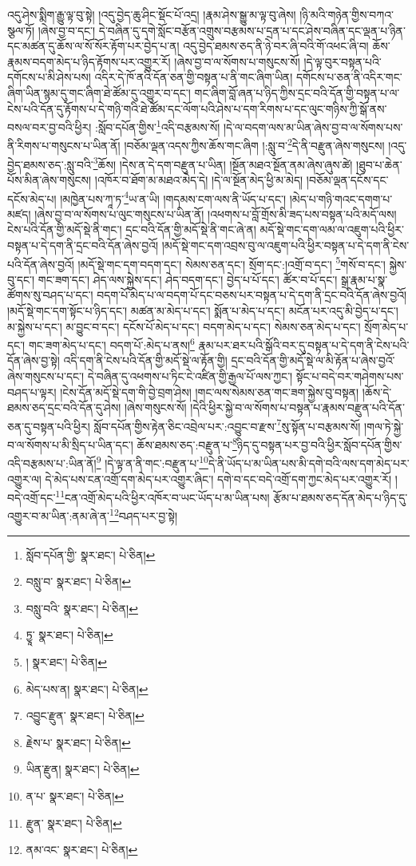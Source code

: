 འདུ་ཤེས་སྨིག་རྒྱུ་ལྟ་བུ་སྟེ། །འདུ་བྱེད་ཆུ་ཤིང་སྡོང་པོ་འདྲ། །རྣམ་ཤེས་སྒྱུ་མ་ལྟ་བུ་ཞེས། །ཉི་མའི་གཉེན་གྱིས་བཀའ་སྩལ་ཏོ། །ཞེས་བྱ་བ་དང་། དེ་བཞིན་དུ་དགེ་སློང་བརྩོན་འགྲུས་བརྩམས་པ་དྲན་པ་དང་ཤེས་བཞིན་དང་ལྡན་པ་ཉིན་དང་མཚན་དུ་ཆོས་ལ་སོ་སོར་རྟོག་པར་བྱེད་པ་ན། འདུ་བྱེད་ཐམས་ཅད་ནི་ཉེ་བར་ཞི་བའི་གོ་འཕང་ཞི་བ། ཆོས་རྣམས་བདག་མེད་པ་ཉིད་རྟོགས་པར་འགྱུར་རོ། །ཞེས་བྱ་བ་ལ་སོགས་པ་གསུངས་སོ། །དེ་ལྟ་བུར་བསྟན་པའི་དགོངས་པ་མི་ཤེས་པས། འདིར་དེ་ཁོ་ནའི་དོན་ཅན་གྱི་བསྟན་པ་ནི་གང་ཞིག་ཡིན། དགོངས་པ་ཅན་ནི་འདིར་གང་ཞིག་ཡིན་སྙམ་དུ་གང་ཞིག་ཐེ་ཚོམ་དུ་འགྱུར་བ་དང་། གང་ཞིག་བློ་ཞན་པ་ཉིད་ཀྱིས་དྲང་བའི་དོན་གྱི་བསྟན་པ་ལ་ངེས་པའི་དོན་དུ་རྟོགས་པ་དེ་གཉི་གའི་ཐེ་ཚོམ་དང་ལོག་པའི་ཤེས་པ་དག་རིགས་པ་དང་ལུང་གཉིས་ཀྱི་སྒོ་ནས་བསལ་བར་བྱ་བའི་ཕྱིར། :སློབ་དཔོན་གྱིས་\footnote{སློབ་དཔོན་གྱི་  སྣར་ཐང་།  པེ་ཅིན། }འདི་བརྩམས་སོ། །དེ་ལ་བདག་ལས་མ་ཡིན་ཞེས་བྱ་བ་ལ་སོགས་པས་ནི་རིགས་པ་གསུངས་པ་ཡིན་ནོ། །བཅོམ་ལྡན་འདས་ཀྱིས་ཆོས་གང་ཞིག །:སླུ་བ་\footnote{བསླུ་བ་  སྣར་ཐང་།  པེ་ཅིན། }དེ་ནི་བརྫུན་ཞེས་གསུངས། །འདུ་བྱེད་ཐམས་ཅད་:སླུ་བའི་\footnote{བསླུ་བའི་  སྣར་ཐང་།  པེ་ཅིན། }ཆོས། །དེས་ན་དེ་དག་བརྫུན་པ་ཡིན། །སྔོན་མཐའ་སྔོན་ནམ་ཞེས་ཞུས་ཚེ། །ཐུབ་པ་ཆེན་པོས་མིན་ཞེས་གསུངས། །འཁོར་བ་ཐོག་མ་མཐའ་མེད་དེ། །དེ་ལ་སྔོན་མེད་ཕྱི་མ་མེད། །བཅོམ་ལྡན་དངོས་དང་དངོས་མེད་པ། །མཁྱེན་པས་ཀཱ་ཏ་\footnote{ཏྱཱ་  སྣར་ཐང་།  པེ་ཅིན། }ཡ་ན་ཡི། །གདམས་ངག་ལས་ནི་ཡོད་པ་དང་། །མེད་པ་གཉི་གའང་དགག་པ་མཛད། །ཞེས་བྱ་བ་ལ་སོགས་པ་ལུང་གསུངས་པ་ཡིན་ནོ། །འཕགས་པ་བློ་གྲོས་མི་ཟད་པས་བསྟན་པའི་མདོ་ལས། ངེས་པའི་དོན་གྱི་མདོ་སྡེ་ནི་གང་། དྲང་བའི་དོན་གྱི་མདོ་སྡེ་ནི་གང་ཞེ་ན། མདོ་སྡེ་གང་དག་ལམ་ལ་འཇུག་པའི་ཕྱིར་བསྟན་པ་དེ་དག་ནི་དྲང་བའི་དོན་ཞེས་བྱའོ། །མདོ་སྡེ་གང་དག་འབྲས་བུ་ལ་འཇུག་པའི་ཕྱིར་བསྟན་པ་དེ་དག་ནི་ངེས་པའི་དོན་ཞེས་བྱའོ། །མདོ་སྡེ་གང་དག་བདག་དང་། སེམས་ཅན་དང་། སྲོག་དང་:།འགྲོ་བ་དང་། \footnote{།   སྣར་ཐང་།  པེ་ཅིན། }གསོ་བ་དང་། སྐྱེས་བུ་དང་། གང་ཟག་དང་། ཤེད་ལས་སྐྱེས་དང་། ཤེད་བདག་དང་། བྱེད་པ་པོ་དང་། ཚོར་བ་པོ་དང་། སྒྲ་རྣམ་པ་སྣ་ཚོགས་སུ་བཤད་པ་དང་། བདག་པོ་མེད་པ་ལ་བདག་པོ་དང་བཅས་པར་བསྟན་པ་དེ་དག་ནི་དྲང་བའི་དོན་ཞེས་བྱའོ། །མདོ་སྡེ་གང་དག་སྟོང་པ་ཉིད་དང་། མཚན་མ་མེད་པ་དང་། སྨོན་པ་མེད་པ་དང་། མངོན་པར་འདུ་མི་བྱེད་པ་དང་། མ་སྐྱེས་པ་དང་། མ་བྱུང་བ་དང་། དངོས་པོ་མེད་པ་དང་། བདག་མེད་པ་དང་། སེམས་ཅན་མེད་པ་དང་། སྲོག་མེད་པ་དང་། གང་ཟག་མེད་པ་དང་། བདག་པོ་:མེད་པ་ནས།\footnote{མེད་པས་ན།  སྣར་ཐང་།  པེ་ཅིན། } རྣམ་པར་ཐར་པའི་སྒོའི་བར་དུ་བསྟན་པ་དེ་དག་ནི་ངེས་པའི་དོན་ཞེས་བྱ་སྟེ། འདི་དག་ནི་ངེས་པའི་དོན་གྱི་མདོ་སྡེ་ལ་རྟོན་གྱི། དྲང་བའི་དོན་གྱི་མདོ་སྡེ་ལ་མི་རྟོན་པ་ཞེས་བྱའོ་ཞེས་གསུངས་པ་དང་། དེ་བཞིན་དུ་འཕགས་པ་ཏིང་ངེ་འཛིན་གྱི་རྒྱལ་པོ་ལས་ཀྱང་། སྟོང་པ་བདེ་བར་གཤེགས་པས་བཤད་པ་ལྟར། །ངེས་དོན་མདོ་སྡེ་དག་གི་བྱེ་བྲག་ཤེས། །གང་ལས་སེམས་ཅན་གང་ཟག་སྐྱེས་བུ་བསྟན། །ཆོས་དེ་ཐམས་ཅད་དྲང་བའི་དོན་དུ་ཤེས། །ཞེས་གསུངས་སོ། །དེའི་ཕྱིར་སྐྱེ་བ་ལ་སོགས་པ་བསྟན་པ་རྣམས་བརྫུན་པའི་དོན་ཅན་དུ་བསྟན་པའི་ཕྱིར། སློབ་དཔོན་གྱིས་རྟེན་ཅིང་འབྲེལ་པར་:འབྱུང་བ་རྫས་\footnote{འབྱུང་རྫུན་  སྣར་ཐང་།  པེ་ཅིན། }སུ་སྟོན་པ་བརྩམས་སོ། །གལ་ཏེ་སྐྱེ་བ་ལ་སོགས་པ་མི་སྲིད་པ་ཡིན་དང་། ཆོས་ཐམས་ཅད་:བརྫུན་པ་\footnote{རྗེས་པ་  སྣར་ཐང་།  པེ་ཅིན། }ཉིད་དུ་བསྟན་པར་བྱ་བའི་ཕྱིར་སློབ་དཔོན་གྱིས་འདི་བརྩམས་པ་:ཡིན་ནོ།\footnote{ཡིན་རྫུན།  སྣར་ཐང་།  པེ་ཅིན། } །དེ་ལྟ་ན་ནི་གང་:བརྫུན་པ་\footnote{ན་པ་  སྣར་ཐང་།  པེ་ཅིན། }དེ་ནི་ཡོད་པ་མ་ཡིན་པས་མི་དགེ་བའི་ལས་དག་མེད་པར་འགྱུར་ལ། དེ་མེད་པས་ངན་འགྲོ་དག་མེད་པར་འགྱུར་ཞིང་། དགེ་བ་དང་བདེ་འགྲོ་དག་ཀྱང་མེད་པར་འགྱུར་རོ། །བདེ་འགྲོ་དང་\footnote{རྫུན་  སྣར་ཐང་།  པེ་ཅིན། }ངན་འགྲོ་མེད་པའི་ཕྱིར་འཁོར་བ་ཡང་ཡོད་པ་མ་ཡིན་པས། རྩོམ་པ་ཐམས་ཅད་དོན་མེད་པ་ཉིད་དུ་འགྱུར་བ་མ་ཡིན་:ནམ་ཞེ་ན་\footnote{ནམ་འང་  སྣར་ཐང་།  པེ་ཅིན། }བཤད་པར་བྱ་སྟེ། 